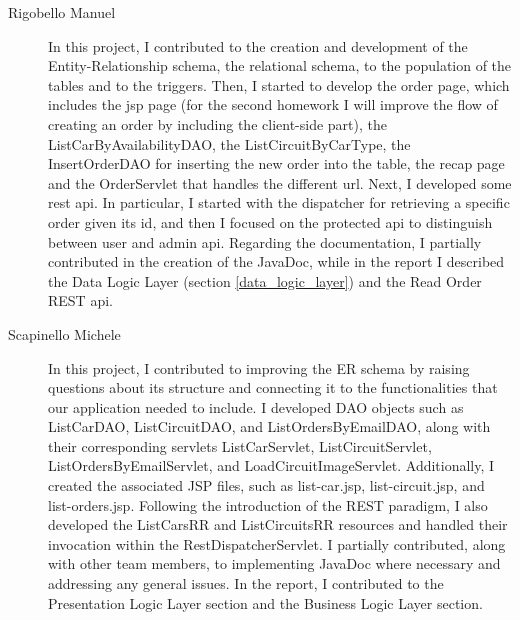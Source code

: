 \begin{description}
	\item[Rigobello Manuel] In this project, I contributed to the creation and development of the Entity-Relationship schema, the relational schema, to the population of the tables and to the triggers. Then, I started to develop the order page, which includes the jsp page (for the second homework I will improve the flow of creating an order by including the client-side part), the ListCarByAvailabilityDAO, the ListCircuitByCarType, the InsertOrderDAO for inserting the new order into the table, the recap page and the OrderServlet that handles the different url. Next, I developed some rest api. In particular, I started with the dispatcher for retrieving a specific order given its id, and then I focused on the protected api to distinguish between user and admin api. Regarding the documentation, I partially contributed in the creation of the JavaDoc, while in the report I described the Data Logic Layer (section \ref{data_logic_layer}) and the Read Order REST api.
	\item[Scapinello Michele] In this project, I contributed to improving the ER schema by raising questions about its structure and connecting it to the functionalities that our application needed to include.
								I developed DAO objects such as ListCarDAO, ListCircuitDAO, and ListOrdersByEmailDAO, along with their corresponding servlets ListCarServlet, ListCircuitServlet, ListOrdersByEmailServlet, and LoadCircuitImageServlet.
	Additionally, I created the associated JSP files, such as list-car.jsp, list-circuit.jsp, and list-orders.jsp. Following the introduction of the REST paradigm, I also developed the ListCarsRR and ListCircuitsRR resources and handled their invocation within the RestDispatcherServlet.
	I partially contributed, along with other team members, to implementing JavaDoc where necessary and addressing any general issues.
	In the report, I contributed to the Presentation Logic Layer section and the Business Logic Layer section.

\end{description}
